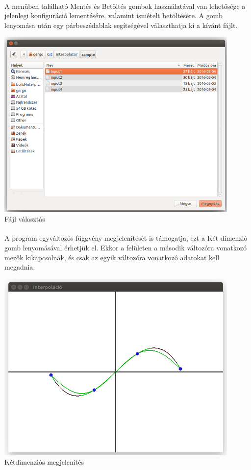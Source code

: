 \documentclass[12pt]{report}
\begin{document}
\paragraph{}
A menüben található Mentés és Betöltés gombok használatával van lehetősége a jelenlegi konfiguráció lementésére, valamint ismételt betöltésére. A gomb lenyomása után egy párbeszédablak segítségével választhatja ki a kívánt fájlt.
\begin{center}
\includegraphics[width=12cm]{pics/gui/files}  \\
{\footnotesize Fájl választás} 
\end{center}
\paragraph{}
A program egyváltozós függvény megjelenítését is támogatja, ezt a Két dimenzió gomb lenyomásával érhetjük el. Ekkor a felületen a második változóra vonatkozó mezők kikapcsolnak, és csak az egyik változóra vonatkozó adatokat kell megadnia.
\begin{center}
\includegraphics[width=12cm]{pics/gui/view1}  \\
{\footnotesize Kétdimenziós megjelenítés} 
\end{center}
\end{document}
